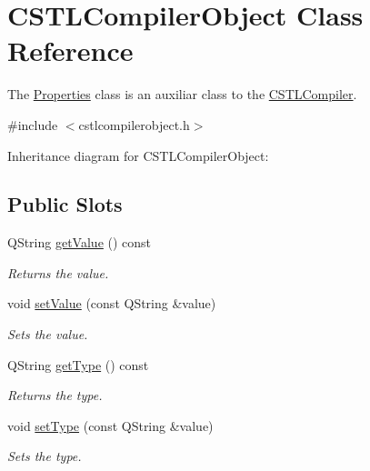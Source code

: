 \hypertarget{class_c_s_t_l_compiler_object}{}\section{C\+S\+T\+L\+Compiler\+Object Class Reference}
\label{class_c_s_t_l_compiler_object}


The \mbox{\hyperlink{class_properties}{Properties}} class is an auxiliar class to the \mbox{\hyperlink{class_c_s_t_l_compiler}{C\+S\+T\+L\+Compiler}}.  




{\ttfamily \#include $<$cstlcompilerobject.\+h$>$}



Inheritance diagram for C\+S\+T\+L\+Compiler\+Object\+:
\subsection*{Public Slots}
\begin{DoxyCompactItemize}
\item 
Q\+String \mbox{\hyperlink{class_c_s_t_l_compiler_object_a3ee0eea5271717302cd4cb34720b656e}{get\+Value}} () const
\begin{DoxyCompactList}\small\item\em Returns the value. \end{DoxyCompactList}\item 
void \mbox{\hyperlink{class_c_s_t_l_compiler_object_ab32dd59c381d9fbf7d2ce58226c4f93a}{set\+Value}} (const Q\+String \&value)
\begin{DoxyCompactList}\small\item\em Sets the value. \end{DoxyCompactList}\item 
Q\+String \mbox{\hyperlink{class_c_s_t_l_compiler_object_a3e853137310474444650ad78e307b9a8}{get\+Type}} () const
\begin{DoxyCompactList}\small\item\em Returns the type. \end{DoxyCompactList}\item 
void \mbox{\hyperlink{class_c_s_t_l_compiler_object_a16ec55cd3515f6d72c79c565bcad9243}{set\+Type}} (const Q\+String \&value)
\begin{DoxyCompactList}\small\item\em Sets the type. \end{DoxyCompactList}\end{DoxyCompactItemize}
